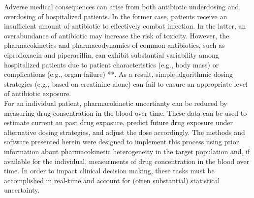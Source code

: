 \documentclass{article}\usepackage[]{graphicx}\usepackage[]{color}
\begin{document}


Adverse medical consequences can arise from both antibiotic underdosing and overdosing of hospitalized patients. In the former case, patients receive an insufficient amount of antibiotic to effectively combat infection. In the latter, an overabundance of antibiotic may increase the risk of toxicity. However, the pharmacokinetics and pharmacodynamics of common antibiotics, such as ciprofloxacin and piperacillin, can exhibit substantial variability among hospitalized patients due to patient characteristics (e.g., body mass) or complications (e.g., organ failure) **. As a result, simple algorithmic dosing strategies (e.g., based on creatinine alone) can fail to ensure an appropriate level of antibiotic exposure.\\

For an individual patient, pharmacokinetic uncertianty can be reduced by measuring drug consentration in the blood over time. These data can be used to estimate current an past drug exposure, predict future drug exposure under alternative dosing strategies, and adjust the dose accordingly. The methods and software presented herein were designed to implement this process using prior information about pharmacokinetic heterogeneity in the target population and, if available for the individual, measurments of drug concentration in the blood over time. In order to impact clinical decision making, these tasks must be accomplished in real-time and account for (often substantial) statistical uncertainty.\\
\end{document}
